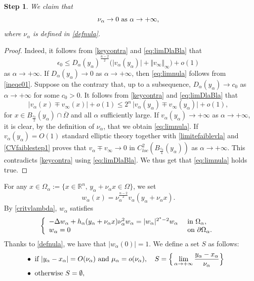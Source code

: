 \documentclass[10pt]{amsart}
\numberwithin{equation}{section}
\newcommand{\Om}{\Omega}
\newcommand{\ma}{\mu_\alpha}
\def \rr {\mathbb{R}}
\def \ep{\epsilon}
\def \bb{\hbox}
\def \vv {\mathbb{\Vert}}
\def \xl{x_\alpha}
\def \ls{+\infty}
\def\la{\alpha}
\def \ma{\mu_{\alpha}}
\def \yl{y_{\alpha}}
\def \va{v_{\alpha}}
\def \na {\nu_{\alpha}}
\def \vo {v_{\infty}}
\newtheorem{step}{Step}
\theoremstyle{plain}
\theoremstyle{remark}
\begin{document}
\begin{step}\label{limnula}
	We claim that 
	\begin{equation}\label{eq:limnula}
		\nu_\la \to 0  \bb{ as } \la \to \ls,
	\end{equation}
	where $\nu_{\la}$ is defined in \eqref{defnula}.
\end{step}
\begin{proof} Indeed, it follows from \eqref{keycontra} and \eqref{eq:limDlaBla} that 
\begin{equation}\label{ineqe01}
\ep_0\leq D_\la(\yl)^{\frac{n-2}{2}}\Big( \big|v_\la(\yl)\big|+\vv \vo \vv_{\infty}\Big)+o(1)
\end{equation}
as $\la \to \ls$. If $D_\la(\yl)\to 0$ as $\la \to \ls$, then \eqref{eq:limnula} follows from \eqref{ineqe01}. Suppose on the contrary that, up to a subsequence, $D_\la(\yl)\to c_0$ as $\alpha\to +\infty$ for some $c_0 >0$. It follows from \eqref{keycontra} and \eqref{eq:limDlaBla} that 
\begin{equation} \label{CVfaiblestep1}
\big|  \va(x)\mp\vo(x)\big|+o(1)\leq 2^n\,   \big| v_\la(\yl)\mp\vo(\yl)\big|+o(1),
\end{equation}
for $x\in B_{\frac{c_0}{2}}(\yl)\cap \overline{\Om}$ and all $\alpha$ sufficiently large. If $v_\la(\yl)\to +\infty$ as $\la \to \ls$, it is clear, by the definition of $\nu_\la$, that we obtain \eqref{eq:limnula}. If $v_\la(\yl)=O(1)$ standard elliptic theory together with \eqref{limitefaiblevla} and \eqref{CVfaiblestep1} proves that $v_\la \mp v_{\infty}\to 0$ in $C^2_{loc}(B_{\frac{c_0}{4}}(\yl))$ as $\la\to \ls$. This contradicts \eqref{keycontra} using \eqref{eq:limDlaBla}. We thus get that \eqref{eq:limnula} holds true. \end{proof}
For any $x\in \Om_\la:=\{ x\in\rr^n, \, \yl+\nu_\la x \in\Om\}$, we set $$w_\la(x)=\nu_\la^{\frac{n-2}{2}}v_\la(\yl+\nu_\la x).$$
By \eqref{critvlambda}, $w_\alpha$ satisfies
\begin{equation}\label{critwla}
\left\{\begin{array}{ll}
-\Delta w_\la +h_{\alpha}(\yl+\na x)\nu_\la^2 w_\la=|w_\la|^{2^*-2} w_\la&\hbox{ in } \Om_{\la}, \\
w_\la=0  &\hbox{ on } \partial\Om_{\la}.
\end{array}\right.
\end{equation}
Thanks to \eqref{defnula}, we have that $\big|w_\la(0)\big|=1$. We define a set $S$ as follows: 
$$ \begin{aligned} 
& \bullet \text{ if }  |\yl-\xl|=O(\nu_\la) \bb{ and } \ma=o(\nu_{\la}), \quad S = \Big \{  \lim_{\la\to\ls}\frac{\yl-\xl}{\nu_\la} \Big \} \\
& \bullet \text{ otherwise } S = \emptyset , 
& \end{aligned}
  $$
\end{document}

